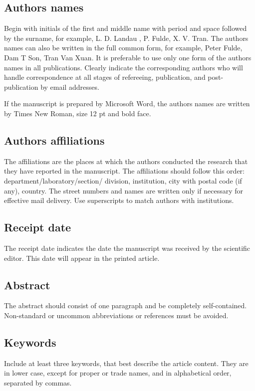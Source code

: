 \documentclass[a4,11pt]{cip-v3-cls-submit}
\begin{document}
\subsection{Authors names}
Begin with initials of the first and middle name with period and space followed by the surname, for example, L. D. Landau , P. Fulde, X. V. Tran. The authors names can also be written in the full common form, for example, Peter Fulde, Dam T Son, Tran Van Xuan. It is preferable to use only one form of the authors names in all publications. Clearly indicate the corresponding authors who will handle correspondence at all stages of refereeing, publication, and post-publication by email addresses.

If the manuscript is prepared by Microsoft Word, the authors names are written by Times New Roman,  size 12 pt and bold face.

\subsection{Authors affiliations}
The affiliations are the places at which the authors conducted the research that they have reported in the manuscript. The affiliations should follow this order: department/laboratory/section/ division, institution, city with postal code (if any), country. The street numbers and names are written only if necessary for effective mail delivery.
Use superscripts to match authors with institutions.

\subsection{Receipt date}
The receipt date indicates the date the manuscript was received by the scientific editor. This date will appear in the printed article.

\subsection{Abstract}
The abstract should consist of one paragraph and be completely self-contained.
Non-standard or uncommon abbreviations or references must be avoided.

\subsection{Keywords}
Include at least three keywords, that best describe the article content. They are in lower case, except for proper or trade names, and in alphabetical order, separated by commas.
\end{document}
